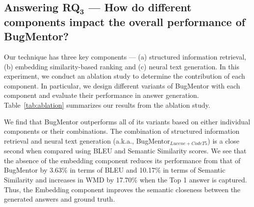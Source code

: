 \subsection{Answering RQ$\mathbf{_3}$ --- How do different components impact the overall performance of BugMentor?}

Our technique has three key components --- (a) structured information retrieval, (b) embedding similarity-based ranking and (c) neural text generation. 
In this experiment, we conduct an ablation study to determine the contribution of each component. In particular, we design different variants of BugMentor with each component and evaluate their performance in answer generation. Table~\ref{tab:ablation} summarizes our results from the ablation study.\par


We find that BugMentor outperforms all of its variants based on either individual components or their combinations. The combination of structured information retrieval and neural text generation (a.k.a., BugMentor$_{Lucene+CodeT5}$) is a close second when compared using BLEU and Semantic Similarity scores. We see that the absence of the embedding component reduces its performance from that of BugMentor by 3.63\% in terms of BLEU and 10.17\% in terms of Semantic Similarity and increases in WMD by 17.70\% when the Top 1 answer is captured. Thus, the Embedding component improves the semantic closeness between the generated answers and ground truth. \par

